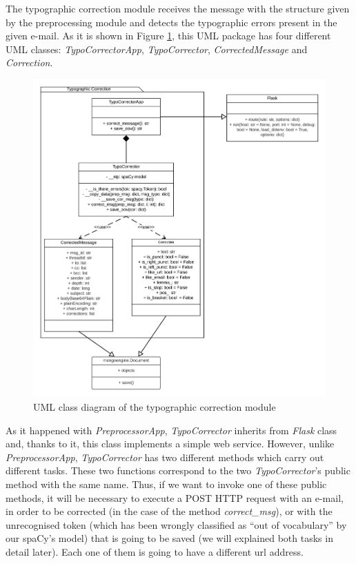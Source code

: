 The typographic correction module receives the message with the structure given by the preprocessing module and detects the typographic errors present in the given e-mail. As it is shown in Figure \ref{fig:umltypo}, this UML package has four different UML classes: \textit{TypoCorrectorApp}, \textit{TypoCorrector}, \textit{CorrectedMessage} and \textit{Correction}.

\begin{figure}[p]
	\centering%
	\centerline{\includegraphics[width=0.9\paperwidth]{Imagenes/Bitmap/Analyser/typoUML.png}}%
	\caption{UML class diagram of the typographic correction module}%
	\label{fig:umltypo}
\end{figure}

As it happened with \textit{PreprocessorApp}, \textit{TypoCorrector} inherits from \textit{Flask} class and, thanks to it, this class implements a simple web service. However, unlike \textit{PreprocessorApp}, \textit{TypoCorrector} has two different methods which carry out different tasks. These two functions correspond to the two \textit{TypoCorrector}'s public method with the same name. Thus, if we want to invoke one of these public methods, it will be necessary to execute a POST HTTP request with an e-mail, in order to be corrected (in the case of the method \textit{correct\_msg}), or with the unrecognised token (which has been wrongly classified as ``out of vocabulary'' by our spaCy's model) that is going to be saved (we will explained both tasks in detail later). Each one of them is going to have a different url address.

